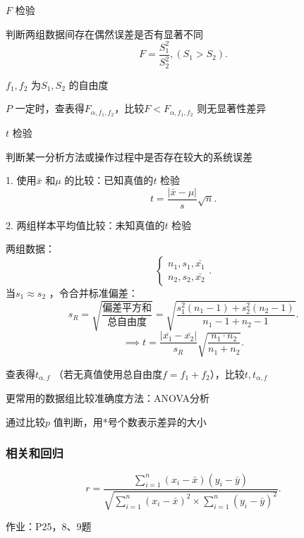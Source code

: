 \begin{notation}
    $F$ 检验

    判断两组数据间存在偶然误差是否有显著不同
    \[
        F=\frac{S_1^2}{S_2^2},\left( S_1>S_2 \right) 
    .\]

    $f_1,f_2$ 为$S_1,S_2$ 的自由度

    $P$ 一定时，查表得$F_{\alpha,f_1,f_2}$，比较$F<F_{\alpha,f_1,f_2}$ 则无显著性差异
\end{notation}

\begin{notation}
    $t$ 检验

    判断某一分析方法或操作过程中是否存在较大的系统误差

    1. 使用$\bar{x}$ 和$\mu$ 的比较：已知真值的$t$ 检验
    \[
        t=\frac{\left| \bar{x}-\mu \right| }{s}\sqrt{n} 
    .\] 
    
    2. 两组样本平均值比较：未知真值的$t$ 检验

    两组数据：
    \[
        \begin{cases}
            n_1,s_1,\bar{x_1}\\
            n_2,s_2,\bar{x_2}
        \end{cases}
    .\] 
    当$s_1\approx s_2$ ，令合并标准偏差：
    \[
        s_{R}=\sqrt{\frac{\text{偏差平方和}}{\text{总自由度}}} =\sqrt{\frac{s_1^2\left( n_1-1 \right) +s_2^2\left( n_2-1 \right) }{n_1-1+n_2-1}}  
    .\] 
    \[
        \implies t=\frac{\left| \bar{x_1}-\bar{x_2} \right| }{s_{R}}\sqrt{\frac{n_1\cdot n_2}{n_1+n_2}} 
    .\] 

    查表得$t_{\alpha,f}$ （若无真值使用总自由度$f=f_1+f_2$），比较$t,t_{\alpha,f}$
\end{notation}

\begin{notation}
    更常用的数据组比较准确度方法：ANOVA分析

    通过比较$p$ 值判断，用*号个数表示差异的大小
\end{notation}

\subsubsection{相关和回归}%
\label{subsub:相关和回归}
\[
    r = \frac{\displaystyle{\sum_{i=1}^{n}} \left( x_{i}-\bar{x} \right) \left( y_{i}-\bar{y} \right) }{\sqrt{\displaystyle{\sum_{i=1}^{n}} \left( x_{i}-\bar{x} \right) ^2\times \displaystyle{\sum_{i=1}^{n}} \left( y_{i}-\bar{y} \right)^2 } }
.\] 

作业：P25，8、9题

